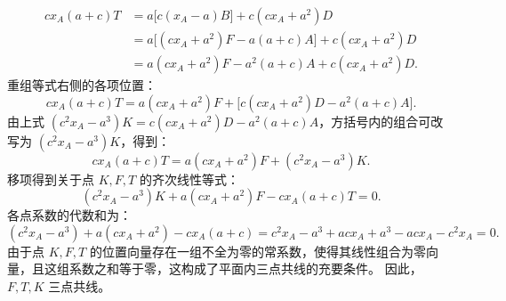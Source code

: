 \begin{solution}
\begin{align*}
c x_A(a + c) T &= a \big[ c(x_A - a) B \big] + c(cx_A + a^2) D \\
&= a \big[ (cx_A + a^2) F - a(a + c) A \big] + c(cx_A + a^2) D \\
&= a(cx_A + a^2) F - a^2(a + c) A + c(cx_A + a^2) D.
\end{align*}
重组等式右侧的各项位置：
\[ c x_A(a + c) T = a(cx_A + a^2) F + \big[ c(cx_A + a^2) D - a^2(a + c) A \big]. \]
由上式 $(c^2 x_A-a^3)K=c(cx_A+a^2)D-a^2(a+c)A$，方括号内的组合可改写为 $(c^2 x_A-a^3)K$，得到：
\[ c x_A(a + c) T = a(cx_A + a^2) F + (c^2 x_A - a^3) K. \]
移项得到关于点 $K, F, T$ 的齐次线性等式：
\[ (c^2 x_A - a^3) K + a(cx_A + a^2) F - c x_A(a + c) T = 0. \]
各点系数的代数和为：
\[ (c^2 x_A - a^3) + a(cx_A + a^2) - c x_A(a + c) = c^2 x_A - a^3 + ac x_A + a^3 - ac x_A - c^2 x_A = 0. \]
由于点 $K, F, T$ 的位置向量存在一组不全为零的常系数，使得其线性组合为零向量，且这组系数之和等于零，这构成了平面内三点共线的充要条件。
因此，$F, T, K$ 三点共线。
\end{solution}

